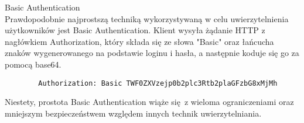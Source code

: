 	\item{Basic Authentication} \\
	Prawdopodobnie najprostszą techniką wykorzystywaną w celu uwierzytelnienia użytkowników jest Basic Authentication. Klient wysyła żądanie HTTP z nagłówkiem Authorization, który składa się ze słowa "Basic" oraz łańcucha znaków wygenerowanego na podstawie loginu i hasła, a następnie koduje się go za pomocą base64.
	
	\begin{verbatim}
		Authorization: Basic TWF0ZXVzejp0b2plc3Rtb2plaGFzbG8xMjMh
	\end{verbatim}	
	
	Niestety, prostota Basic Authentication wiąże się z wieloma ograniczeniami oraz mniejszym bezpieczeństwem względem innych technik uwierzytelniania.